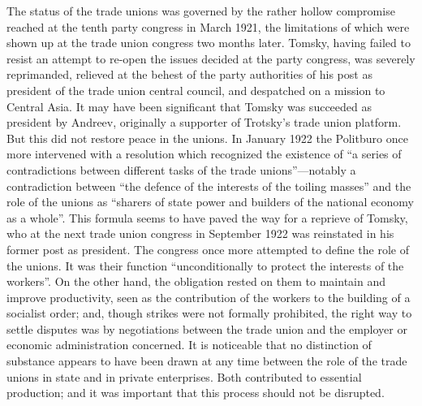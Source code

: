 The status of the trade unions was governed by the rather hollow compromise reached at the tenth party congress in March 1921, the limitations of which were shown up at the trade union congress two months later. Tomsky, having failed to resist an attempt to re-open the issues decided at the party congress, was severely reprimanded, relieved at the behest of the party authorities of his post as president of the trade union central council, and despatched on a mission to Central Asia. It may have been significant that Tomsky was succeeded as president by Andreev, originally a supporter of Trotsky's trade union platform. But this did not restore peace in the unions. In January 1922 the Politburo once more intervened with a resolution which recognized the existence of ``a series of contradictions between different tasks of the trade unions''---notably a contradiction between ``the defence of the interests of the toiling masses'' and the role of the unions as ``sharers of state power and builders of the national economy as a whole''. This formula seems to have paved the way for a reprieve of Tomsky, who at the next trade union congress in September 1922 was reinstated in his former post as president. The congress once more attempted to define the role of the unions. It was their function ``unconditionally to protect the interests of the workers''. On the other hand, the obligation rested on them to maintain and improve productivity, seen as the contribution of the workers to the building of a socialist order; and, though strikes were not formally prohibited, the right way to settle disputes was by negotiations between the trade union and the employer or economic administration concerned. It is noticeable that no distinction of substance appears to have been drawn at any time between the role of the trade unions in state and in private enterprises. Both contributed to essential production; and it was important that this process should not be disrupted. 

